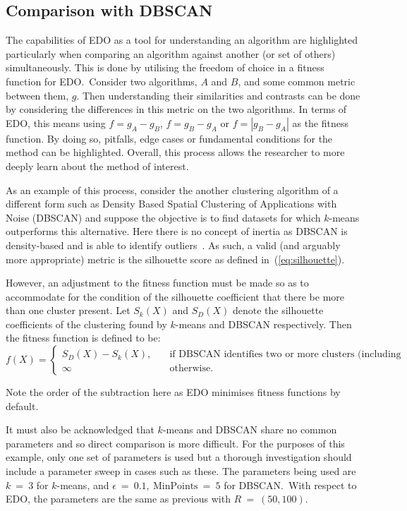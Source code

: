 
\subsection{Comparison with DBSCAN}

The capabilities of EDO as a tool for understanding an algorithm are highlighted
particularly when comparing an algorithm against another (or set of others)
simultaneously.  This is done by utilising the freedom of choice in a fitness
function for EDO.\ Consider two algorithms, \(A\) and \(B\), and some common
metric between them, \(g\). Then understanding their similarities and contrasts
can be done by considering the differences in this metric on the two algorithms.
In terms of EDO, this means using \(f = g_A - g_B\), \(f = g_B - g_A\) or \(f
= \left| g_B - g_A \right|\) as the fitness function. By doing so, pitfalls,
edge cases or fundamental conditions for the method can be highlighted.
Overall, this process allows the researcher to more deeply learn about the
method of interest.

As an example of this process, consider the another clustering algorithm of a
different form such as Density Based Spatial Clustering of Applications with
Noise (DBSCAN) and suppose the objective is to find datasets for which
\(k\)-means outperforms this alternative. Here there is no concept of inertia as
DBSCAN is density-based and is able to identify outliers~\cite{Ester1996}. As
such, a valid (and arguably more appropriate) metric is the silhouette score as
defined in~(\ref{eq:silhouette}).

However, an adjustment to the fitness function must be made so as to accommodate
for the condition of the silhouette coefficient that there be more than one
cluster present. Let \(S_k (X)\) and \(S_D (X)\) denote the silhouette
coefficients of the clustering found by \(k\)-means and DBSCAN respectively.
Then the fitness function is defined to be:
\[
    f(X) = 
        \begin{cases}
            S_D (X) - S_k (X), &\quad \text{if DBSCAN identifies two or more
            clusters (including noise)}\\
            \infty &\quad \text{otherwise.}
        \end{cases}
\]

Note the order of the subtraction here as EDO minimises fitness functions by
default.

It must also be acknowledged that \(k\)-means and DBSCAN share no common
parameters and so direct comparison is more difficult. For the purposes of this
example, only one set of parameters is used but a thorough investigation should
include a parameter sweep in cases such as these. The parameters being used are
\(k~=~3\) for \(k\)-means, and \(\epsilon~=~0.1,\ \text{MinPoints}~=~5\) for
DBSCAN.\ With respect to EDO, the parameters are the same as previous with
\(R~=~(50, 100)\).

